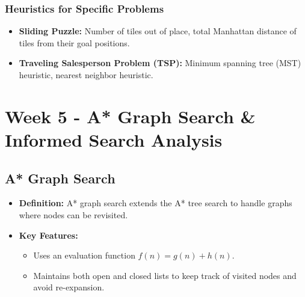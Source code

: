 \documentclass[8pt]{article}
\begin{document}
\subsubsection*{Heuristics for Specific Problems}
\begin{itemize}
    \item \textbf{Sliding Puzzle:} Number of tiles out of place, total Manhattan distance of tiles from their goal positions.
    \item \textbf{Traveling Salesperson Problem (TSP):} Minimum spanning tree (MST) heuristic, nearest neighbor heuristic.
\end{itemize}

\newpage
\section{Week 5 - A* Graph Search \& Informed Search Analysis}
\subsection{A* Graph Search}
\begin{itemize}
    \item \textbf{Definition:} A* graph search extends the A* tree search to handle graphs where nodes can be revisited.
    \item \textbf{Key Features:}
    \begin{itemize}
        \item Uses an evaluation function \( f(n) = g(n) + h(n) \).
        \item Maintains both open and closed lists to keep track of visited nodes and avoid re-expansion.
    \end{itemize}
\end{itemize}
\end{document}
